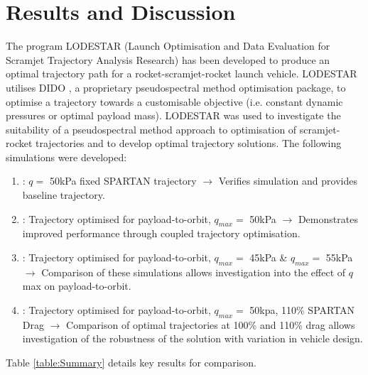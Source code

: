 \documentclass[]{aiaa-tc}
\begin{document}
\section{Results and Discussion} \label{section:results}
The program LODESTAR (Launch Optimisation and Data Evaluation for Scramjet Trajectory Analysis Research) has been developed to produce an optimal trajectory path for a rocket-scramjet-rocket launch vehicle. LODESTAR utilises DIDO \cite{Ross}, a proprietary pseudospectral method optimisation package, to optimise a trajectory towards a customisable objective (i.e. constant dynamic pressures or optimal payload mass). 
LODESTAR was used to investigate the suitability of a pseudospectral method approach to optimisation of scramjet-rocket trajectories and to develop optimal trajectory solutions. The following simulations were developed: 
\begin{enumerate}
	\item: $q = $ 50kPa fixed SPARTAN trajectory \newline$\rightarrow$ Verifies simulation and provides baseline trajectory.
	\item: Trajectory optimised for payload-to-orbit, $q_{max} = $ 50kPa \newline$\rightarrow$ Demonstrates improved performance through coupled trajectory optimisation.
	\item: Trajectory optimised for payload-to-orbit, $q_{max} = $ 45kPa \& $q_{max} = $ 55kPa \newline$\rightarrow$ Comparison of these simulations allows investigation into the effect of $q$ max on payload-to-orbit.
	\item: Trajectory optimised for payload-to-orbit,  $q_{max} = $ 50kpa, 110\% SPARTAN Drag \newline$\rightarrow$ Comparison of optimal trajectories at 100\% and 110\% drag allows investigation of the robustness of the solution with variation in vehicle design. 
\end{enumerate}

Table \ref{table:Summary} details key results for comparison. 
\end{document}
